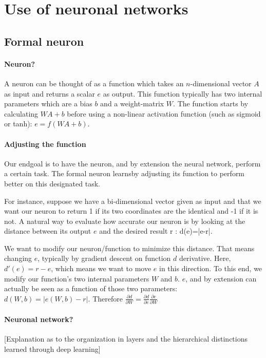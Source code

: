 \documentclass[conference]{IEEEtran}
\begin{document}
\section{Use of neuronal networks}

\subsection{Formal neuron}

\paragraph{Neuron?}
A neuron can be thought of as a function which takes an $n$-dimensional vector $A$ as input and returns a scalar $e$ as output. This function typically has two internal parameters which are a bias $b$ and a weight-matrix $W$. The function starts by calculating $WA+b$ before using a non-linear activation function (such as sigmoid or tanh): $e=f(WA+b)$.

\paragraph{Adjusting the function}
Our endgoal is to have the neuron, and by extension the neural network, perform
a certain task. The formal neuron \og learns\fg by adjusting its function to perform better on
this designated task.

For instance, suppose we have a bi-dimensional vector given as input and that we
want our neuron to return 1 if its two coordinates are the identical and -1 if
it is not. A natural way to evaluate how accurate our neuron is by looking at the
distance between its output $e$ and the desired result r : d(e)=|e-r|.

We want to modify our neuron/function to minimize this distance. That means
changing $e$, typically by gradient descent on function $d$ derivative. Here,
$d'(e) = r-e$, which means we want to \og move\fg{} $e$ in this
direction. To this end, we modify our function's two internal parameters $W$ and
$b$. $e$, and by extension can actually be seen as a function of those two
parameters: $d(W,b)=|e(W,b)-r|$. Therefore $\frac{\partial d}{\partial W}
   = \frac{\partial d}{\partial e}\frac{\partial e}{\partial W}$
\paragraph{Neuronal network?}

[Explanation as to the organization in layers and the hierarchical distinctions learned through deep learning]
\end{document}
